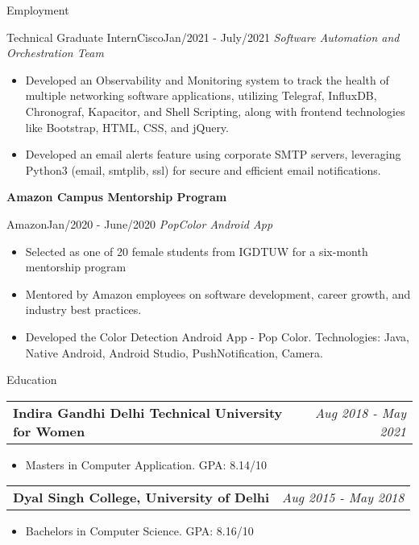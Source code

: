 \documentclass[]{mcdowellcv}
\begin{document}
\begin{cvsection}{Employment}
\begin{cvsubsection}{Technical Graduate Intern}{Cisco}{\normalfont Jan/2021 - July/2021}
            \textit{Software Automation and Orchestration Team} \vspace{-0.2em}
            \begin{itemize}
                \item Developed an Observability and Monitoring system to track the health of multiple networking software applications, utilizing Telegraf, InfluxDB, Chronograf, Kapacitor, and Shell Scripting, along with frontend technologies like Bootstrap, HTML, CSS, and jQuery.
			    \item Developed an email alerts feature using corporate SMTP servers, leveraging Python3 (email, smtplib, ssl) for secure and efficient email notifications.
            \end{itemize}
        \end{cvsubsection}

        \begin{cvsubsection}{\parbox[t]{0.6\textwidth}{\textbf{Amazon Campus Mentorship Program}}}{Amazon}{\normalfont Jan/2020 - June/2020}
            \textit{PopColor Android App} \vspace{-0.2em} %
            \begin{itemize}[leftmargin=1.5em]
                \item Selected as one of 20 female students from IGDTUW for a six-month mentorship program
                \item Mentored by Amazon employees on software development, career growth, and industry best practices.
                \item Developed the Color Detection Android App - Pop Color. Technologies: Java, Native Android, Android Studio, PushNotification, Camera.
            \end{itemize}
        \end{cvsubsection}
    \end{cvsection}

    \begin{cvsection}{Education}
        \begin{tabularx}{\textwidth}{Xr}
            \textbf{Indira Gandhi Delhi Technical University for Women} & \textit{Aug 2018 - May 2021} \\
        \end{tabularx}
        \begin{itemize}
            \item Masters in Computer Application. GPA: 8.14/10
        \end{itemize}
        
        \begin{tabularx}{\textwidth}{Xr}
            \textbf{Dyal Singh College, University of Delhi} & \textit{Aug 2015 - May 2018} \\
        \end{tabularx}
        \begin{itemize}
            \item Bachelors in Computer Science. GPA: 8.16/10
        \end{itemize}
    \end{cvsection}
\end{document}

